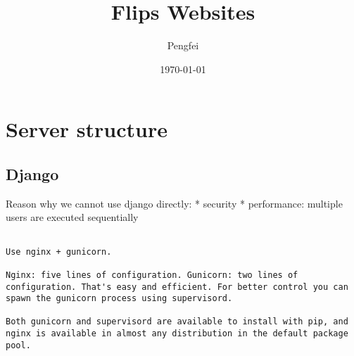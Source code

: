 \documentclass[12pt]{article}
\begin{document}
\title{Flips Websites}
\author{Pengfei}
\date{\today}
\maketitle

\section{Server structure}
\subsection{Django}
Reason why we cannot use django directly:
* security
* performance: multiple users are executed sequentially

\begin{verbatim}

Use nginx + gunicorn.

Nginx: five lines of configuration. Gunicorn: two lines of configuration. That's easy and efficient. For better control you can spawn the gunicorn process using supervisord.

Both gunicorn and supervisord are available to install with pip, and nginx is available in almost any distribution in the default package pool.
\end{verbatim}
    
\end{document}
